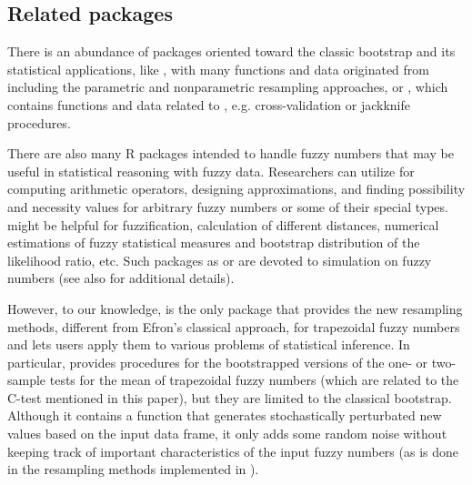 

\subsection{Related packages}

There is an abundance of packages oriented toward the classic bootstrap and its statistical applications, like  \citep{bootMan}, with many functions and data originated from \cite{davison_hinkley_1997} including the parametric and nonparametric resampling approaches, or  \citep{bootstrapMan}, which contains functions and data related to \cite{EfroTibs93}, e.g. cross-validation or jackknife procedures.

There are also many R packages intended to handle fuzzy numbers that may be useful in statistical reasoning with fuzzy data.
Researchers can utilize   \citep{FuzzyNumbersMan} for computing arithmetic operators, designing approximations, and finding possibility and necessity values for arbitrary fuzzy numbers or some of their special types.  \citep{FuzzySTsMan} might be helpful for fuzzification, calculation of different distances, numerical estimations of fuzzy statistical measures and bootstrap distribution of the likelihood ratio, etc. 
Such packages as  \citep{Trutschnig2013} or  \citep{SimPLFNMan} are devoted to simulation on fuzzy numbers  (see also \cite{COROIANU201326} for additional details).

However, to our knowledge,  is the only package that provides the new resampling methods, different from Efron's classical approach, for trapezoidal fuzzy numbers and lets users apply them to various problems of statistical inference.
In particular,  provides procedures for the bootstrapped versions of the one- or two-sample tests for the mean of trapezoidal fuzzy numbers (which are related to the C-test mentioned in this paper), but they are limited to the classical bootstrap. Although it contains a function that generates stochastically perturbated new values based on the input data frame, it only adds some random noise without keeping track of important characteristics of the input fuzzy numbers (as is done in the resampling methods implemented in ).






